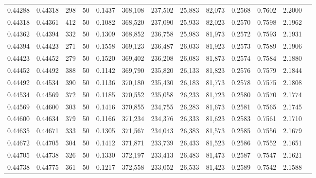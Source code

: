 \begin{tabular}{rrrrrrrrrrrrr}
0.44288 & 0.44318 &   298 &  50 &                                     0.1437 & 368,108 & 237,502 &  25,883 &  82,073 & 0.2568 & 0.7602 & 2.2000 \\
0.44318 & 0.44361 &   412 &  50 &                                     0.1082 & 368,520 & 237,090 &  25,933 &  82,023 & 0.2570 & 0.7598 & 2.1962 \\
0.44362 & 0.44394 &   332 &  50 &                                     0.1309 & 368,852 & 236,758 &  25,983 &  81,973 & 0.2572 & 0.7593 & 2.1931 \\
0.44394 & 0.44423 &   271 &  50 &                                     0.1558 & 369,123 & 236,487 &  26,033 &  81,923 & 0.2573 & 0.7589 & 2.1906 \\
0.44423 & 0.44452 &   279 &  50 &                                     0.1520 & 369,402 & 236,208 &  26,083 &  81,873 & 0.2574 & 0.7584 & 2.1880 \\
0.44452 & 0.44492 &   388 &  50 &                                     0.1142 & 369,790 & 235,820 &  26,133 &  81,823 & 0.2576 & 0.7579 & 2.1844 \\
0.44492 & 0.44534 &   390 &  50 &                                     0.1136 & 370,180 & 235,430 &  26,183 &  81,773 & 0.2578 & 0.7575 & 2.1808 \\
0.44534 & 0.44569 &   372 &  50 &                                     0.1185 & 370,552 & 235,058 &  26,233 &  81,723 & 0.2580 & 0.7570 & 2.1774 \\
0.44569 & 0.44600 &   303 &  50 &                                     0.1416 & 370,855 & 234,755 &  26,283 &  81,673 & 0.2581 & 0.7565 & 2.1745 \\
0.44600 & 0.44634 &   379 &  50 &                                     0.1166 & 371,234 & 234,376 &  26,333 &  81,623 & 0.2583 & 0.7561 & 2.1710 \\
0.44635 & 0.44671 &   333 &  50 &                                     0.1305 & 371,567 & 234,043 &  26,383 &  81,573 & 0.2585 & 0.7556 & 2.1679 \\
0.44672 & 0.44705 &   304 &  50 &                                     0.1412 & 371,871 & 233,739 &  26,433 &  81,523 & 0.2586 & 0.7552 & 2.1651 \\
0.44705 & 0.44738 &   326 &  50 &                                     0.1330 & 372,197 & 233,413 &  26,483 &  81,473 & 0.2587 & 0.7547 & 2.1621 \\
0.44738 & 0.44775 &   361 &  50 &                                     0.1217 & 372,558 & 233,052 &  26,533 &  81,423 & 0.2589 & 0.7542 & 2.1588 \\

\end{tabular}
